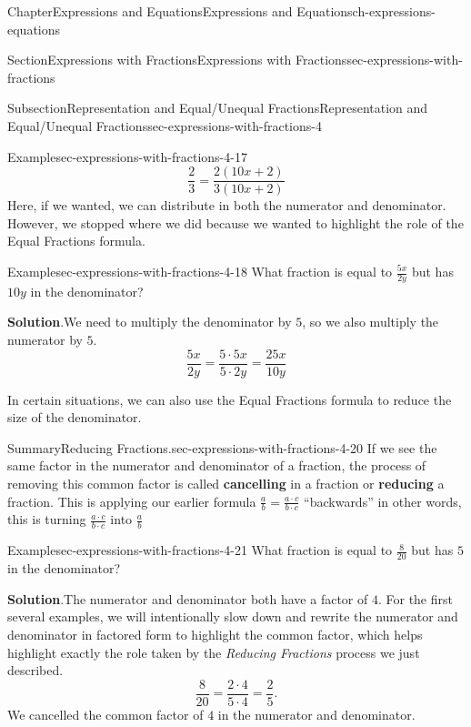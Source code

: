 \documentclass[twoside,11pt,]{book}
\newcommand{\blocktitlefont}{\relax}
\newcommand{\terminology}[1]{\textbf{#1}}
\numberwithin{equation}{chapter}
\begin{document}
\begin{chapterptx}{Chapter}{Expressions and Equations}{}{Expressions and Equations}{}{}{ch-expressions-equations}
\begin{sectionptx}{Section}{Expressions with Fractions}{}{Expressions with Fractions}{}{}{sec-expressions-with-fractions}
\begin{subsectionptx}{Subsection}{Representation and Equal\slash{}Unequal Fractions}{}{Representation and Equal\slash{}Unequal Fractions}{}{}{sec-expressions-with-fractions-4}
\begin{example}{Example}{}{sec-expressions-with-fractions-4-17}
\begin{equation*}
\frac23=\frac{2(10x+2)}{3(10x+2)}
\end{equation*}
Here, if we wanted, we can distribute in both the numerator and denominator. However, we stopped where we did because we wanted to highlight the role of the Equal Fractions formula.%
\end{example}
\begin{example}{Example}{}{sec-expressions-with-fractions-4-18}%
What fraction is equal to \(\frac{5x}{2y}\) but has \(10y\) in the denominator?%
\par\smallskip%
\noindent\textbf{\blocktitlefont Solution}.\hypertarget{sec-expressions-with-fractions-4-18-2}{}\quad{}We need to multiply the denominator by \(5\), so we also multiply the numerator by \(5\).%
\begin{equation*}
\frac{5x}{2y}=\frac{5 \cdot 5x}{5 \cdot 2y}=\frac{25x}{10y}
\end{equation*}
%
\end{example}
In certain situations, we can also use the Equal Fractions formula to reduce the size of the denominator.%
\begin{assemblage}{Summary}{Reducing Fractions.}{sec-expressions-with-fractions-4-20}%
If we see the same factor in the numerator and denominator of a fraction, the process of removing this common factor is called \terminology{cancelling} in a fraction or \terminology{reducing} a fraction. This is applying our earlier formula \(\frac{a}{b}=\frac{a \cdot c}{b \cdot c}\) ``backwards'' in other words, this is turning \(\frac{a \cdot c}{b \cdot c}\) into \(\frac{a}{b}\)%
\end{assemblage}
\begin{example}{Example}{}{sec-expressions-with-fractions-4-21}%
What fraction is equal to \(\frac{8}{20}\) but has \(5\) in the denominator?%
\par\smallskip%
\noindent\textbf{\blocktitlefont Solution}.\hypertarget{sec-expressions-with-fractions-4-21-2}{}\quad{}The numerator and denominator both have a factor of \(4\). For the first several examples, we will intentionally slow down and rewrite the numerator and denominator in factored form to highlight the common factor, which helps highlight exactly the role taken by the \emph{Reducing Fractions} process we just described.%
\begin{equation*}
\frac{8}{20}=\frac{2 \cdot 4}{5 \cdot 4}=\frac{2}{5}.
\end{equation*}
We cancelled the common factor of \(4\) in the numerator and denominator.%

\end{example}
\end{subsectionptx}
\end{sectionptx}
\end{chapterptx}
\end{document}
